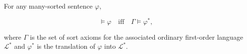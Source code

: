 For any many-sorted sentence $\varphi$,

$$\models \varphi \quad \text{iff} \quad \Gamma \models \varphi^*,$$

where $\Gamma$ is the set of sort axioms for the associated ordinary first-order language $\mathcal{L}^*$ and $\varphi^*$ is the translation of $\varphi$ into $\mathcal{L}^*$.
